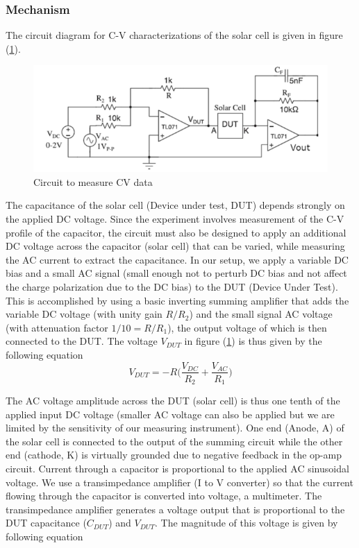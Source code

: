 \documentclass[%
 aip,
 amsmath,amssymb,
 reprint, floatfix%
]{revtex4-2}
\begin{document}
        \subsubsection{Mechanism}
            The circuit diagram for C-V characterizations of the solar cell is given in figure (\ref{fig:cv-cir}). 
            \begin{figure}
                \centering
                \includegraphics[scale = 0.6]{Figures/cvcircuit.png}
                \caption{Circuit to measure CV data}
                \label{fig:cv-cir}
            \end{figure}
            \par
            The capacitance of the solar cell (Device under test, DUT) depends strongly on the applied DC voltage. Since the experiment involves measurement of the C-V profile of the capacitor, the circuit must also be designed to apply an additional DC voltage across the capacitor (solar cell) that can be varied, while measuring the AC current to extract the capacitance. In our setup, we apply a variable DC bias and a small AC signal (small enough not to perturb DC bias and not affect the charge polarization due to the DC bias) to the DUT (Device Under Test). This is accomplished by using a basic inverting summing amplifier that adds the variable DC voltage (with unity gain $R/R_2$) and the small signal AC voltage (with attenuation factor $1/10 = R/R_1$), the output voltage of which is then connected to the DUT. The voltage $V_{DUT}$ in figure (\ref{fig:cv-cir}) is thus given by the following equation
            \begin{equation}
                V_{DUT} = - R \Bigg( \dfrac{V_{DC}}{R_2} + \dfrac{V_{AC}}{R_1} \Bigg)
            \end{equation}
            \par
            The AC voltage amplitude across the DUT (solar cell) is thus one tenth of the applied input DC voltage (smaller AC voltage can also be applied but we are limited by the sensitivity of our measuring instrument). One end (Anode, A) of the solar cell is connected to the output of the summing circuit while the other end (cathode, K) is virtually grounded due to negative feedback in the op-amp circuit. Current through a capacitor is proportional to the applied AC sinusoidal voltage. We use a transimpedance amplifier (I to V converter) so that the current flowing through the capacitor is converted into voltage, a multimeter. The transimpedance amplifier generates a voltage output that is proportional to the DUT capacitance ($C_{DUT}$) and $V_{DUT}$. The magnitude of this voltage is given by following equation
\end{document}
